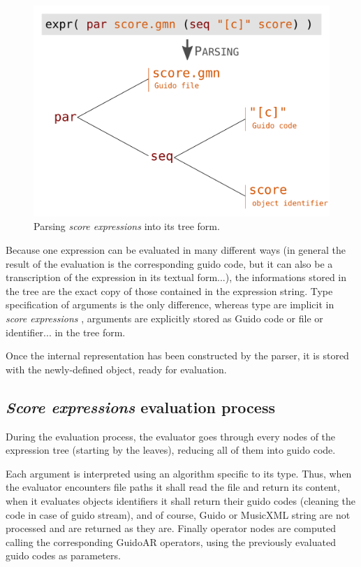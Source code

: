 \documentclass{article}
\newcommand{\sExpr}{\emph{score expressions} }
\newcommand{\SExpr}{\emph{Score expressions} }
\begin{document}
\begin{figure}[th]
\centering
\includegraphics[width=0.9\columnwidth]{imgs/exprParse}
\caption{Parsing \sExpr into its tree form.
\label{fig:parsing}}
\end{figure}

Because one expression can be evaluated in many different ways (in general the result of the evaluation is the corresponding guido code, but it can also be a transcription of the expression in its textual form...), the informations stored in the tree are the exact copy of those contained in the expression string. Type specification of arguments is the only difference, whereas type are implicit in \sExpr, arguments are explicitly stored as Guido code or file or identifier... in the tree form. 

Once the internal representation has been constructed by the parser, it is stored with the newly-defined object, ready for evaluation.

\subsection{\SExpr evaluation process}
During the evaluation process, the evaluator goes through every nodes of the expression tree (starting by the leaves), reducing all of them into guido code.

Each argument is interpreted using an algorithm specific to its type. Thus, when the evaluator encounters file paths it shall read the file and return its content, when it evaluates objects identifiers it shall return their guido codes (cleaning the code in case of guido stream), and of course, Guido or MusicXML string are not processed and are returned as they are. Finally operator nodes are computed calling the corresponding GuidoAR operators, using the previously evaluated guido codes as parameters.
\end{document}
